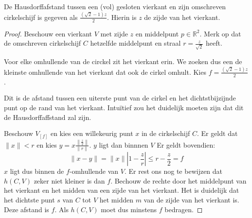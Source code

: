 \documentclass[main.tex]{subfiles}
\begin{document}
\begin{vb}
  De Hausdorffafstand tussen een (vol) gesloten vierkant en zijn omschreven cirkelschijf is gegeven als $\frac{(\sqrt{2}-1)z}{2}$.
  Hierin is $z$ de zijde van het vierkant.

  \begin{proof}
    Beschouw een vierkant $V$ met zijde $z$ en middelpunt $p\in \mathbb{R}^{2}$.
    Merk op dat de omschreven cirkelschijf $C$ hetzelfde middelpunt en straal $r=\frac{z}{\sqrt{2}}$ heeft.
    \begin{figure}[H]
        \centering
      \end{figure}
    Voor elke omhullende van de circkel zit het vierkant erin.
    We zoeken dus een de kleinste omhullende van het vierkant dat ook de cirkel omhult.
    Kies $f = \frac{(\sqrt{2}-1)z}{2}$.
    \begin{klad}
      Dit is de afstand tussen een uiterste punt van de cirkel en het dichtstbijzijnde punt op de rand van het vierkant.
      Intu\"itief zou het duidelijk moeten zijn dat dit de Hausdorffaffstand zal zijn.
    \end{klad}
    Beschouw $V_{[f]}$ en kies een willekeurig punt $x$ in de cirkelschijf $C$.
    Er geldt dat $\|x\| < r$ en kies $y = x\frac{\left\|\frac{z}{2}\right\|}{\|r\|}$.
    $y$ ligt dan binnnen $V$\waarom
    Er geldt bovendien:
    \[ \|x-y\| = \|x\| \left|1-\frac{z}{r}\right| \le r - \frac{z}{2} = f \]
    $x$ ligt dus binnen de $f$-omhullende van $V$.
    Er rest ons nog te bewijzen dat $h(C,V)$ zeker niet kleiner is dan $f$.
    Bechouw de rechte door het middelpunt van het vierkant en het midden van een zijde van het vierkant.
    Het is duidelijk dat het dichtste punt $s$ van $C$ tot $V$ het midden $m$ van de zijde van het vierkant is.
    Deze afstand is $f$.
    Als $h(C,V)$ moet dus minstens $f$ bedragen.
  \end{proof}
\end{vb}
\end{document}
